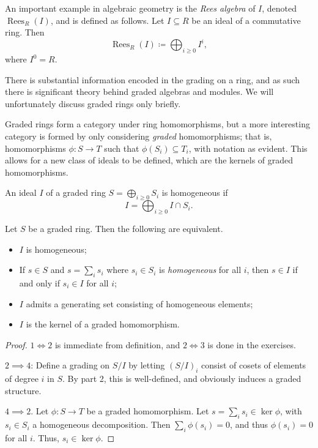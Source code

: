 An important example in algebraic geometry is the \emph{Rees algebra} of $I$, denoted $\operatorname{Rees}_R(I)$, and is defined as follows. Let $I\subseteq R$ be an ideal of a commutative ring. Then
\[
	\operatorname{Rees}_R(I)\coloneqq \bigoplus_{i\geq0}I^i
,\]
where $I^0=R$.

There is substantial information encoded in the grading on a ring, and as such there is significant theory behind graded algebras and modules. We will unfortunately discuss graded rings only briefly.

Graded rings form a category under ring homomorphisms, but a more interesting category is formed by only considering \emph{graded} homomorphisms; that is, homomorphisms $\phi : S \to T$ such that $\phi (S_i)\subseteq T_i$, with notation as evident. This allows for a new class of ideals to be defined, which are the kernels of graded homomorphisms.
\begin{definition}\label{dfn:8.18}
	An ideal $I$ of a graded ring $S=\bigoplus_{i\geq 0}S_i$ is homogeneous if
	\[
		I=\bigoplus_{i\geq 0}I \cap S_i
	.\]
\end{definition}
\begin{lemma}\label{lma:8.7}
	Let $S$ be a graded ring. Then the following are equivalent.
	\begin{itemize}
		\item $I$ is homogeneous;
		\item If $s\in S$ and $s=\sum_{i} s_i$ where $s_i\in S_i$ is \emph{homogeneous} for all $i$, then $s\in I$ if and only if $s_i\in I$ for all $i$;
		\item $I$ admits a generating set consisting of homogeneous elements;
		\item $I$ is the kernel of a graded homomorphism.
	\end{itemize}
\end{lemma}
\begin{proof}
	$1 \iff 2$ is immediate from definition, and $2\iff 3$ is done in the exercises.

	$2\implies 4$: Define a grading on $S/I$ by letting $(S/I)_i$ consist of cosets of elements of degree $i$ in $S$. By part 2, this is well-defined, and obviously induces a graded structure.

	$4\implies 2$. Let $\phi : S \to T$ be a graded homomorphism. Let $s=\sum_{i} s_i\in \ker \phi $, with $s_i\in S_i$ a homogeneous decomposition. Then $\sum_{i} \phi (s_i)=0$, and thus $\phi (s_i)=0$ for all $i$. Thus, $s_i\in \ker \phi $.
\end{proof}

